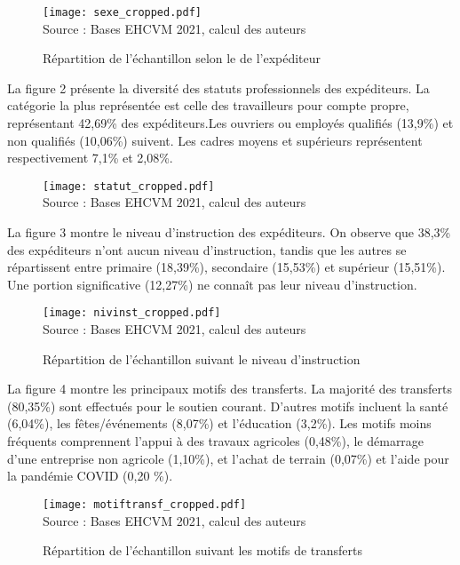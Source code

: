 \documentclass[a4paper,12pt]{article}
\begin{document}
\begin{figure}[!ht]
	\centering
	\caption{Répartition de l'échantillon selon le de l'expéditeur}
	\texttt{[image: sexe\_cropped.pdf]}\\
	Source : Bases EHCVM 2021, calcul des auteurs
\end{figure}



La figure 2 présente la diversité des statuts professionnels des expéditeurs. La catégorie la plus représentée est celle des travailleurs pour compte propre, représentant 42,69\% des expéditeurs.Les ouvriers ou employés qualifiés (13,9\%) et non qualifiés (10,06\%) suivent. Les cadres moyens et supérieurs représentent respectivement 7,1\% et 2,08\%.

\begin{figure}[!ht]
	\centering
	\caption{}
	\texttt{[image: statut\_cropped.pdf]}\\
	Source : Bases EHCVM 2021, calcul des auteurs
\end{figure}

\newpage 

La figure 3 montre le niveau d'instruction des expéditeurs. On observe que 38,3\% des expéditeurs n'ont aucun niveau d'instruction, tandis que les autres se répartissent entre primaire (18,39\%), secondaire (15,53\%) et supérieur (15,51\%). Une portion significative (12,27\%) ne connaît pas leur niveau d'instruction.

\begin{figure}[!ht]
	\centering
	\caption{Répartition de l'échantillon suivant le niveau d'instruction}
	\texttt{[image: nivinst\_cropped.pdf]}\\
	Source : Bases EHCVM 2021, calcul des auteurs
\end{figure}


La figure 4 montre les principaux motifs des transferts. La majorité des transferts (80,35\%) sont effectués pour le soutien courant. D'autres motifs incluent la santé (6,04\%), les fêtes/événements (8,07\%) et l'éducation (3,2\%). Les motifs moins fréquents comprennent l'appui à des travaux agricoles (0,48\%), le démarrage d'une entreprise non agricole (1,10\%), et l'achat de terrain (0,07\%) et l'aide pour la pandémie COVID (0,20 \%).


\begin{figure}[!ht]
	\centering
	\caption{Répartition de l'échantillon suivant les motifs de transferts}
	\texttt{[image: motiftransf\_cropped.pdf]}\\
	Source : Bases EHCVM 2021, calcul des auteurs
\end{figure}
\end{document}
